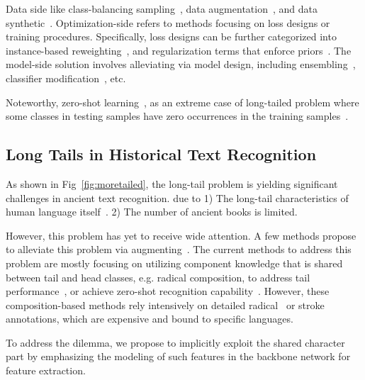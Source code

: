 Data side like class-balancing sampling~\cite{upsam}, data augmentation~\cite{cutmix}, and data synthetic~\cite{smote,hzsl}. 
Optimization-side refers to methods focusing on loss designs or training procedures. Specifically, loss designs can be further categorized into instance-based reweighting~\cite{focal,otem}, and regularization terms that enforce priors~\cite{fudanvi,sanicdar23,logvar}.
The model-side solution involves alleviating via model design, including ensembling~\cite{fle,flmoe}, classifier modification~\cite{normrob}, etc.

Noteworthy, zero-shot learning~\cite{gzsl-survey}, as an extreme case of long-tailed problem where some classes in testing samples have zero occurrences in the training samples~\cite{olt}.

\subsection{Long Tails in Historical Text Recognition}

As shown in Fig~\ref{fig:moretailed}, the long-tail problem is yielding significant challenges in ancient text recognition. 
due to 1) The long-tail characteristics of human language itself~\cite{yang2022survey}. 2) The number of ancient books is limited. 

However, this problem has yet to receive wide attention. 
A few methods propose to alleviate this problem via augmenting~\cite{aaoracle,atlt}.
The current methods to address this problem are mostly focusing on utilizing component knowledge that is shared between tail and head classes, e.g. radical composition, to address tail performance~\cite{obcmk2,sanicdar23,fudanvi}, or achieve zero-shot recognition capability~\cite{jinic21,gold,9412607,DBLP:conf/icfhr/ChandaBHHSS18,wubizhengma}. However, these composition-based methods rely intensively on detailed radical~\cite{fewran} or stroke~\cite{taktak} annotations, which are expensive and bound to specific languages.

To address the dilemma, we propose to implicitly exploit the shared character part by emphasizing the modeling of such features in the backbone network for feature extraction.
